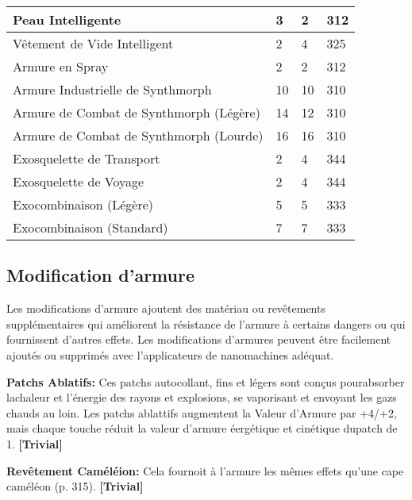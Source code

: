 \begin{table}
\begin{tabular}{|l|l|l|l|}
Peau Intelligente	&3	&2	&312	\\ \hline

Vêtement de Vide Intelligent	&2	&4	&325	\\ \hline

Armure en Spray	&2	&2	&312	\\ \hline

Armure Industrielle de Synthmorph	&10	&10	&310	\\ \hline

Armure de Combat de Synthmorph (Légère)	&14	&12	&310	\\ \hline

Armure de Combat de Synthmorph (Lourde)	&16	&16	&310	\\ \hline

Exosquelette de Transport	&2	&4	&344	\\ \hline

Exosquelette de Voyage	&2	&4	&344	\\ \hline

Exocombinaison (Légère)	&5	&5	&333	\\ \hline

Exocombinaison (Standard)	&7	&7	&333	\\ \hline

\end{tabular} \label{tab:armor-values} \end{table} 



\subsection{Modification d'armure} \label{sec:armor-mods} 

Les modifications d'armure ajoutent des matériau ou revêtements supplémentaires qui améliorent la résistance de l'armure à certains dangers ou qui fournissent d'autres effets. Les modifications d'armures peuvent être facilement ajoutés ou supprimés avec l'applicateurs de nanomachines adéquat. 

\textbf{Patchs Ablatifs:} Ces patchs autocollant, fins et légers sont conçus pourabsorber lachaleur et l'énergie des rayons et explosions, se vaporisant et envoyant les gazs chauds au loin. Les patchs ablattifs augmentent la Valeur d'Armure par +4/+2, mais chaque touche réduit la valeur d'armure éergétique et cinétique dupatch de 1. \textbf{[Trivial]} 

\textbf{Revêtement Caméléion:} Cela fournoit à l'armure les mêmes effets qu'une cape caméléon (p. 315). \textbf{[Trivial]} 

